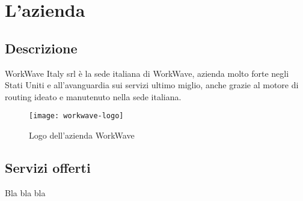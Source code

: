 
\chapter{L'azienda}
\label{cap:azienda}

\section{Descrizione}

WorkWave Italy srl è la sede italiana di WorkWave, azienda molto forte negli Stati Uniti e all’avanguardia sui servizi ultimo miglio, anche grazie al motore di routing ideato e manutenuto nella sede italiana. 

\begin{figure}[H] 
  \centering 
  \texttt{[image: workwave-logo]} 
  \caption{Logo dell'azienda WorkWave}
\end{figure}

\section{Servizi offerti}

Bla bla bla
